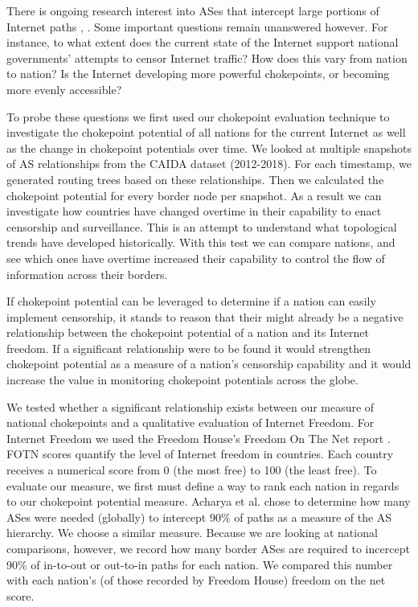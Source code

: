 \documentclass[10pt, conference, letterpaper]{IEEEtran}
\begin{document}
There is ongoing research interest into ASes that intercept large portions of Internet paths \cite{throats}, \cite{decoy}. Some important questions remain unanswered however. For instance, to what
extent does the current state of the Internet support national governments' attempts to censor Internet traffic? How does this vary from nation to nation? Is the Internet developing more
powerful chokepoints, or becoming more evenly accessible?
\par
To probe these questions we first used our chokepoint evaluation technique to investigate the chokepoint potential of all nations for the current Internet as well as the
change in chokepoint potentials over time. We looked at multiple snapshots of AS relationships from the CAIDA dataset (2012-2018).
For each timestamp, we generated routing trees based on these relationships. Then we calculated the chokepoint potential for every border node per snapshot. As a result we can investigate
how countries have changed overtime in their capability to enact censorship and surveillance. This is an attempt to understand what topological trends have developed historically.
With this test we can compare nations, and see which ones have overtime increased their capability to control the flow of information across their borders.
\par
If chokepoint potential can be leveraged to determine if a nation can easily implement censorship, it stands to reason that their might already be a negative relationship between
the chokepoint potential of a nation and its Internet freedom. If a significant relationship were to be found it would strengthen chokepoint potential as a measure of a nation's censorship capability
and it would increase the value in monitoring chokepoint potentials across the globe.
\par
We tested whether a significant relationship exists between our measure of national chokepoints and a qualitative evaluation of Internet Freedom. For Internet Freedom we used
the Freedom House's Freedom On The Net report \cite{FOTN}. FOTN scores quantify the level of Internet freedom in countries. Each country receives a numerical score from 0 (the most free)
to 100 (the least free).
 To evaluate our measure, we first must define a way to rank each nation in regards to our chokepoint potential measure.
Acharya et al. \cite{throats} chose to determine how many ASes were needed (globally) to intercept 90\% of paths as a measure of the AS hierarchy. We choose a similar measure. Because we are
looking at national comparisons, however, we record how many border ASes are required to incercept 90\% of in-to-out or out-to-in paths for each nation. We compared this number
with each nation's (of those recorded by Freedom House) freedom on the net score.
\end{document}
